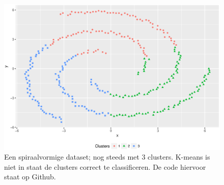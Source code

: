 \begin{itemize}
\begin{figure}
\centering
\caption{Een spiraalvormige dataset; nog steeds met 3 clusters. K-means is niet in staat de clusters correct te classificeren. De code hiervoor staat op Github.}
\label{figure:clusters_kmeans_spiral}
\includegraphics[width=\textwidth]{res/ch4_kmeans_spiral.eps}
\end{figure}
\end{itemize}
